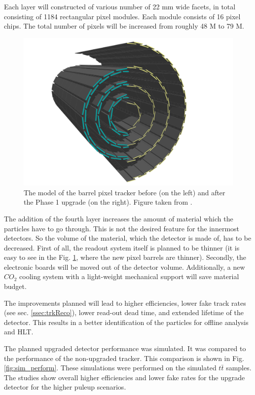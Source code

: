Each layer will constructed of various number of 22 mm wide facets, in total consisting of 1184 rectangular pixel modules. Each module
consists of 16 pixel chips. The total number of pixels will be increased from roughly 48 M to 79 M.

\begin{figure}[t]
 \centering
 \includegraphics[width=1.0\textwidth]{021_pixel_upgrade/plots/pixel_phase1_4_layers.png}
 \caption{The model of the barrel pixel tracker before (on the left) and after the Phase 1 upgrade (on the right). Figure taken from
 \cite{CMS:2012sda}.}
 \label{fig:tracker_4}
\end{figure}

The addition of the fourth layer increases the amount of material which the particles have to go through. This is not
the desired feature for the innermost detectors. So the volume of the material, which the detector is made of, has to be decreased. 
First of all, the readout system itself is planned to be thinner (it is easy to see in the Fig. \ref{fig:tracker_4},
where the new pixel barrels are thinner). Secondly, the electronic boards will be moved out of the detector volume. 
Additionally, a new $CO_{2}$ cooling system \cite{CMS:2012sda} with a light-weight mechanical support will save material budget.

The improvements planned will lead to higher efficiencies, lower fake track rates (see sec. \ref{ssec:trkReco}), lower read-out dead time,
and extended lifetime of the detector. This results in a better identification of the particles for offline analysis and HLT.

The planned upgraded detector performance was simulated. It was compared to the performance of the non-upgraded tracker. This comparison
is shown in Fig. \ref{fig:sim_perform}. These simulations were performed on the simulated $t\bar{t}$ samples. The studies show overall higher 
efficiencies and lower fake rates for the upgrade detector for the higher puleup scenarios.

